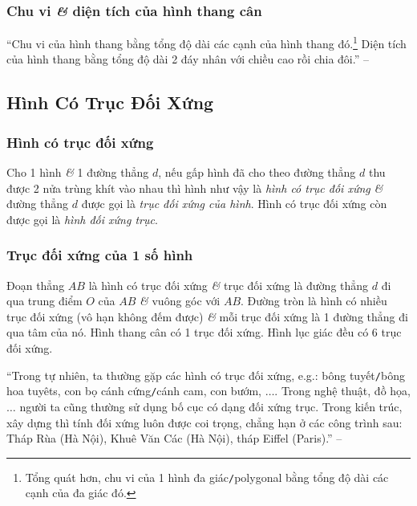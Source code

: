 \documentclass{article}
\numberwithin{equation}{section}
\begin{document}
\subsubsection{Chu vi \textit{\&} diện tích của hình thang cân}
``Chu vi của hình thang bằng tổng độ dài các cạnh của hình thang đó.\footnote{Tổng quát hơn, chu vi của 1 hình đa giác\texttt{/}polygonal bằng tổng độ dài các cạnh của đa giác đó.} Diện tích của hình thang bằng tổng độ dài 2 đáy nhân với chiều cao rồi chia đôi.'' -- \cite[p. 106]{SGK_Toan_6_Canh_Dieu_tap_1}


\subsection{Hình Có Trục Đối Xứng}

\subsubsection{Hình có trục đối xứng}
Cho 1 hình \textit{\&} 1 đường thẳng $d$, nếu gấp hình đã cho theo đường thẳng $d$ thu được 2 nửa trùng khít vào nhau thì hình như vậy là \textit{hình có trục đối xứng} \textit{\&} đường thẳng $d$ được gọi là \textit{trục đối xứng của hình}. Hình có trục đối xứng còn được gọi là \textit{hình đối xứng trục}.

\subsubsection{Trục đối xứng của 1 số hình}
Đoạn thẳng $AB$ là hình có trục đối xứng \textit{\&} trục đối xứng là đường thẳng $d$ đi qua trung điểm $O$ của $AB$ \textit{\&} vuông góc với $AB$. Đường tròn là hình có nhiều trục đối xứng (vô hạn không đếm được) \textit{\&} mỗi trục đối xứng là 1 đường thẳng đi qua tâm của nó. Hình thang cân có 1 trục đối xứng. Hình lục giác đều có 6 trục đối xứng.

``Trong tự nhiên, ta thường gặp các hình có trục đối xứng, e.g.: bông tuyết\texttt{/}bông hoa tuyêts, con bọ cánh cứng\texttt{/}cánh cam, con bướm, $\ldots$. Trong nghệ thuật, đồ họa, $\ldots$ người ta cũng thường sử dụng bố cục có dạng đối xứng trục. Trong kiến trúc, xây dựng thì tính đối xứng luôn được coi trọng, chẳng hạn ở các công trình sau: Tháp Rùa (Hà Nội), Khuê Văn Các (Hà Nội), tháp Eiffel (Paris).'' -- \cite[p. 110]{SGK_Toan_6_Canh_Dieu_tap_1}

\end{document}

